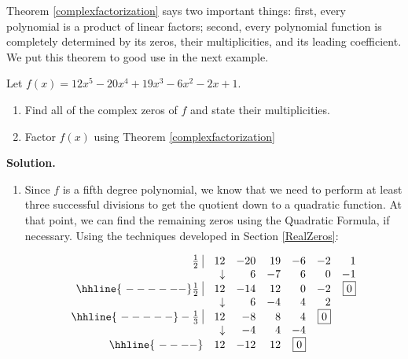 \documentclass{ximera}
\begin{document}
\smallskip

Theorem \ref{complexfactorization} says two important things:  first, every polynomial is a product of linear factors;  second, every polynomial function is completely determined by its zeros, their multiplicities, and its leading coefficient.  We put this theorem to good use in the next example.

\begin{ex}  Let $f(x) = 12x^5 - 20x^4+19x^3-6x^2-2x+1$.

\begin{enumerate}

\item Find all of the complex zeros of $f$ and state their multiplicities.  

\item  Factor $f(x)$ using Theorem \ref{complexfactorization}

\end{enumerate}

{ \bf Solution.}

\begin{enumerate}

\item  Since $f$ is a fifth degree polynomial, we know that we need to perform at least three successful divisions to get the quotient down to a quadratic function.  At that point, we can find the remaining zeros using the Quadratic Formula, if necessary.  Using the techniques developed in Section \ref{RealZeros}:

\[\begin{array}{rrrrrrr}
\frac{1}{2} \, \, \vline& 12 & -20& 19  & -6 & -2 &1 \\

  & \downarrow     &  6  &  -7  & 6 & 0 & -1\\ \hhline{~------} 

 \frac{1}{2} \, \, \vline& 12 & -14 & 12  & 0 & -2 & \fbox{$0$} \\

  & \downarrow     &  6 &  -4  & 4 & 2 &\\ \hhline{~-----} 
  
  -\frac{1}{3} \, \, \vline&  12 &  -8  & 8 & 4 &  \fbox{$0$} & \\
    
               & \downarrow &  -4  &  4  & -4  & & \\ \hhline{~----} 
 
   & 12  &   -12 & 12& \fbox{0} &&   \\
  



\end{array}\]
\end{enumerate}
\end{ex}
\end{document}
